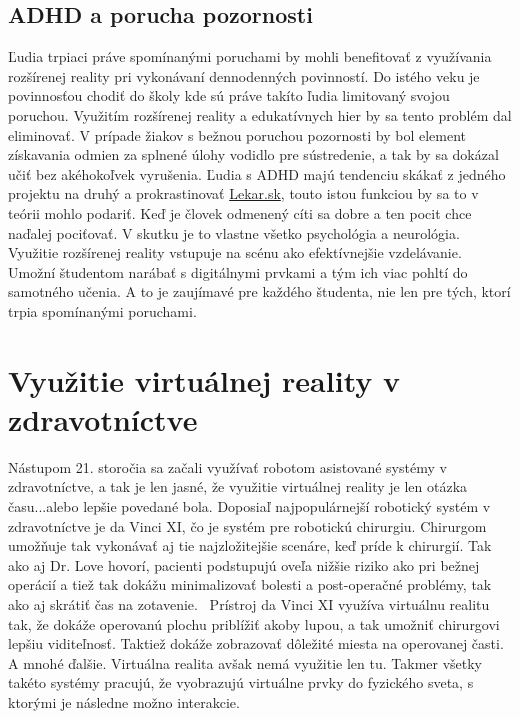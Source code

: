\documentclass[10pt,twoside,a4paper]{article}
\begin{document}
\subsection{ADHD a porucha pozornosti}
Ľudia trpiaci práve spomínanými poruchami by mohli benefitovať z využívania rozšírenej reality pri vykonávaní dennodenných povinností. Do istého veku je povinnosťou chodiť do školy kde sú práve takíto ľudia limitovaný svojou poruchou. Využitím rozšírenej reality a edukatívnych hier by sa tento problém dal eliminovať. V prípade žiakov s bežnou poruchou pozornosti by bol element získavania odmien za splnené úlohy vodidlo pre sústredenie, a tak by sa dokázal učiť bez akéhokoľvek vyrušenia. Ľudia s ADHD majú tendenciu skákať z jedného projektu na druhý a prokrastinovať \href{https://lekar.sk/clanok/porucha-pozornosti-s-hyperaktivitou}{Lekar.sk}, touto istou funkciou by sa to v teórii mohlo podariť. Keď je človek odmenený cíti sa dobre a ten pocit chce naďalej pociťovať. V skutku je to vlastne všetko psychológia a neurológia. Využitie rozšírenej reality vstupuje na scénu ako efektívnejšie vzdelávanie. Umožní študentom narábať s digitálnymi prvkami a tým ich viac pohltí do samotného učenia. A to je zaujímavé pre každého študenta, nie len pre tých, ktorí trpia spomínanými poruchami. 

\section{Využitie virtuálnej reality v zdravotníctve} \label{zdravotnictvo}
Nástupom 21. storočia sa začali využívať robotom asistované systémy v zdravotníctve, a tak je len jasné, že využitie virtuálnej reality je len otázka času...alebo lepšie povedané bola. Doposiaľ najpopulárnejší robotický systém v zdravotníctve je da Vinci XI, čo je systém pre robotickú chirurgiu. Chirurgom umožňuje tak vykonávať aj tie najzložitejšie scenáre, keď príde k chirurgií. Tak ako aj Dr. Love hovorí, pacienti podstupujú oveľa nižšie riziko ako pri bežnej operácií a tiež tak dokážu minimalizovať bolesti a post-operačné problémy, tak ako aj skrátiť čas na zotavenie.~\cite{XiRobots}
Prístroj da Vinci XI využíva virtuálnu realitu tak, že dokáže operovanú plochu priblížiť akoby lupou, a tak umožniť chirurgovi lepšiu viditeľnosť. Taktiež dokáže zobrazovať dôležité miesta na operovanej časti. A mnohé ďalšie. Virtuálna realita avšak nemá využitie len tu. Takmer všetky takéto systémy pracujú, že vyobrazujú virtuálne prvky do fyzického sveta, s ktorými je následne možno interakcie. 
\end{document}
